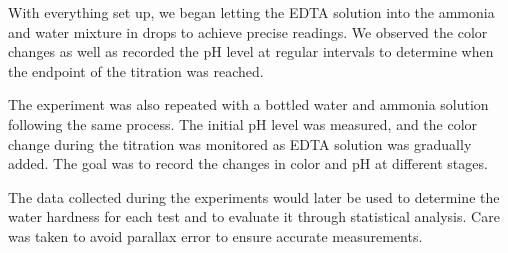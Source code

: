 \documentclass{article}
\begin{document}
With everything set up, we began letting the EDTA solution into the
ammonia and water mixture in drops to achieve precise readings. We
observed the color changes as well as recorded the pH level at
regular intervals to determine when the endpoint of the titration was
reached.

The experiment was also repeated with a bottled water and ammonia
solution following the same process. The initial pH level was
measured, and the color change during the titration was monitored as
EDTA solution was gradually added. The goal was to record the changes
in color and pH at different stages.

The data collected during the experiments would later be used to
determine the water hardness for each test and to evaluate it through
statistical analysis. Care was taken to avoid parallax error to
ensure accurate measurements.

\newpage
\end{document}
